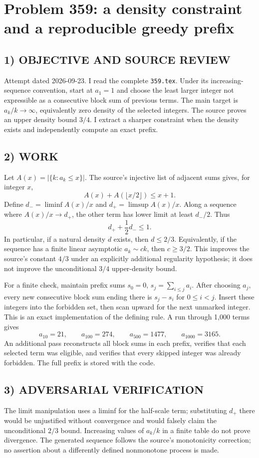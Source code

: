 \section{Problem 359: a density constraint and a reproducible greedy prefix}
\subsection*{1) OBJECTIVE AND SOURCE REVIEW}
Attempt dated 2026-09-23. I read the complete \texttt{359.tex}. Under its increasing-sequence convention, start at $a_1=1$ and choose the least larger integer not expressible as a consecutive block sum of previous terms. The main target is $a_k/k\to\infty$, equivalently zero density of the selected integers. The source proves an upper density bound $3/4$. I extract a sharper constraint when the density exists and independently compute an exact prefix.
\subsection*{2) WORK}
Let $A(x)=|\{k:a_k\le x\}|$. The source's injective list of adjacent sums gives, for integer $x$,
\[
A(x)+A(\lfloor x/2\rfloor)\le x+1.
\]
Define $d_- =\liminf A(x)/x$ and $d_+=\limsup A(x)/x$. Along a sequence where $A(x)/x\to d_+$, the other term has lower limit at least $d_-/2$. Thus
\[
d_++\frac12d_-\le1.
\]
In particular, if a natural density $d$ exists, then $d\le2/3$. Equivalently, if the sequence has a finite linear asymptotic $a_k\sim ck$, then $c\ge3/2$. This improves the source's constant $4/3$ under an explicitly additional regularity hypothesis; it does not improve the unconditional $3/4$ upper-density bound.

For a finite check, maintain prefix sums $s_0=0$, $s_j=\sum_{i\le j}a_i$. After choosing $a_j$, every new consecutive block sum ending there is $s_j-s_i$ for $0\le i<j$. Insert these integers into the forbidden set, then scan upward for the next unmarked integer. This is an exact implementation of the defining rule. A run through 1,000 terms gives
\[
a_{10}=21,\qquad a_{100}=274,\qquad a_{500}=1477,
\qquad a_{1000}=3165.
\]
An additional pass reconstructs all block sums in each prefix, verifies that each selected term was eligible, and verifies that every skipped integer was already forbidden. The full prefix is stored with the code.
\subsection*{3) ADVERSARIAL VERIFICATION}
The limit manipulation uses a liminf for the half-scale term; substituting $d_+$ there would be unjustified without convergence and would falsely claim the unconditional $2/3$ bound. Increasing values of $a_k/k$ in a finite table do not prove divergence. The generated sequence follows the source's monotonicity correction; no assertion about a differently defined nonmonotone process is made.
